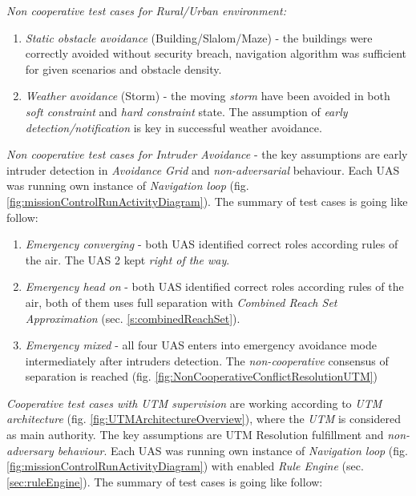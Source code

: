 \noindent\emph{Non cooperative test cases for Rural/Urban environment:}
\begin{enumerate}
    \item\emph{Static obstacle avoidance} (Building/Slalom/Maze) - the buildings were correctly avoided without security breach, navigation algorithm was sufficient for given scenarios and obstacle density.
    
    \item\emph{Weather avoidance} (Storm) - the moving \emph{storm} have been avoided in both \emph{soft constraint} and \emph{hard constraint} state. The assumption of \emph{early detection/notification} is key in successful weather avoidance.
\end{enumerate}

\noindent\emph{Non cooperative test cases for Intruder Avoidance} - the key assumptions are early intruder detection in \emph{Avoidance Grid} and \emph{non-adversarial} behaviour. Each UAS was running own instance of \emph{Navigation loop} (fig. \ref{fig:missionControlRunActivityDiagram}). The summary of test cases is going like follow:

\begin{enumerate}
    \item\emph{Emergency converging} - both UAS identified correct roles according rules of the air. The UAS 2 kept \emph{right of the way}.
    
    \item\emph{Emergency head on} - both UAS identified correct roles according rules of the air, both of them uses full separation with \emph{Combined Reach Set Approximation} (sec. \ref{s:combinedReachSet}).
    
    \item\emph{Emergency mixed} -  all four UAS enters into emergency avoidance mode intermediately after intruders detection. The \emph{non-cooperative} consensus of separation is reached (fig. \ref{fig:NonCooperativeConflictResolutionUTM})
\end{enumerate}

\noindent\emph{Cooperative test cases with UTM supervision} are working according to \emph{UTM architecture} (fig. \ref{fig:UTMArchitectureOverview}), where the \emph{UTM} is considered as main authority. The key assumptions are UTM Resolution fulfillment and \emph{non-adversary behaviour}. Each UAS was running own instance of \emph{Navigation loop} (fig. \ref{fig:missionControlRunActivityDiagram}) with enabled \emph{Rule Engine} (sec. \ref{sec:ruleEngine}). The summary of test cases is going like follow:

